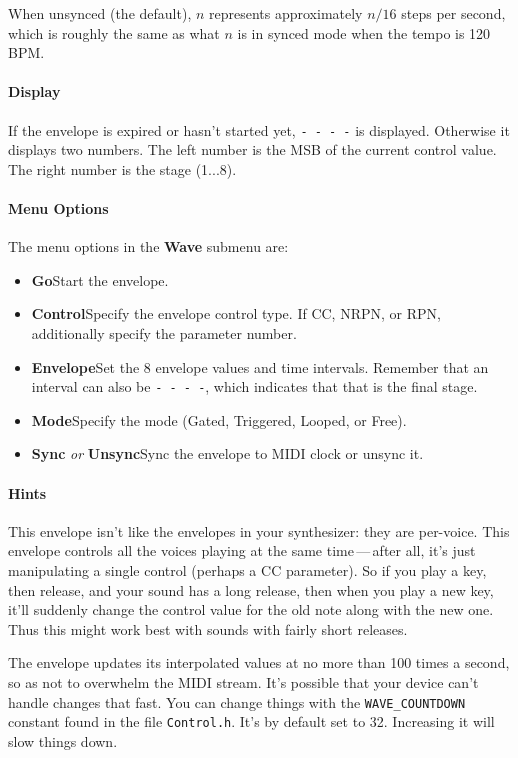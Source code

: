 \documentclass{article}
\begin{document}
When unsynced (the default), \(n\) represents approximately \(n/16\) steps per second, which is roughly the same as what \(n\) is in synced mode when the tempo is 120 BPM.

\paragraph{Display}  If the envelope is expired or hasn't started yet,  \texttt{-~-~-~-} is displayed.  Otherwise it displays two numbers.  The left number is the MSB of the current control value.  The right number is the stage (1...8).

\paragraph{Menu Options}  The menu options in the {\bf Wave} submenu are:

\begin{itemize}
\item {\bf Go}\quad Start the envelope.
\item {\bf Control}\quad Specify the envelope control type.  If CC, NRPN, or RPN, additionally specify the parameter number. 
\item {\bf Envelope}\quad Set the 8 envelope values and time intervals.  Remember that an interval can also be \texttt{-~-~-~-}, which indicates that that is the final stage.
\item {\bf Mode}\quad Specify the mode (Gated, Triggered, Looped, or Free).
\item {\bf Sync} {\it or} {\bf Unsync}\quad Sync the envelope to MIDI clock or unsync it.
\end{itemize}

\paragraph{Hints}  This envelope isn't like the envelopes in your synthesizer: they are per-voice.  This envelope controls all the voices playing at the same time\,---\,after all, it's just manipulating a single control (perhaps a CC parameter).  So if you play a key, then release, and your sound has a long release, then when you play a new key, it'll suddenly change the control value for the old note along with the new one.  Thus this might work best with sounds with fairly short releases.

The envelope updates its interpolated values at no more than 100 times a second, so as not to overwhelm the MIDI stream.  It's possible that your device can't handle changes that fast.  You can change things with the \texttt{WAVE\_COUNTDOWN} constant found in the file \texttt{Control.h}. It's by default set to 32.  Increasing it will slow things down.
\end{document}
